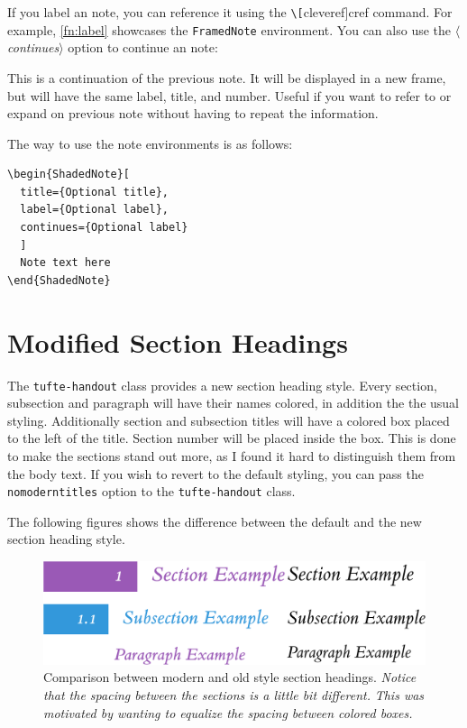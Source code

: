 \documentclass[a4paper]{tufte-handout}
\newcommand{\hlorange}[1]{\textcolor{tufte-orange}{#1}}
\newcommand{\doccmd}[1]{\hlorange{\texttt{\textbackslash#1}}}
\newcommand{\docopt}[1]{\( \langle \)\textrm{\textit{#1}}\( \rangle \)}
\newcommand{\docenv}[1]{\hlorange{\texttt{#1}}}
\newcommand{\doccls}[1]{\texttt{#1}}
\newcommand{\docclsopt}[1]{\hlorange{\texttt{#1}}}
\begin{document}
If you label an note, you can reference it using the \doccmd[cleveref]{cref} command.
For example, \cref{fn:label} showcases the \docenv{FramedNote} environment.
You can also use the \docopt{continues} option to continue an note:

\begin{FramedNote}[continues={fn:label}]
  This is a continuation of the previous note. 
  It will be displayed in a new frame, but will have the same label, title, and number.
  Useful if you want to refer to or expand on previous note without having to repeat the information.
\end{FramedNote}

\noindent The way to use the note environments is as follows:
\begin{Verbatim}
\begin{ShadedNote}[
  title={Optional title}, 
  label={Optional label},
  continues={Optional label}
  ]
  Note text here
\end{ShadedNote}  
\end{Verbatim}


\section{Modified Section Headings}\label{sec:changed-section-headings}
The \doccls{tufte-handout} class provides a new section heading style.
Every section, subsection and paragraph will have their names colored, in addition the the usual styling.
Additionally section and subsection titles will have a colored box placed to the left of the title.
Section number will be placed inside the box.
This is done to make the sections stand out more, as I found it hard to distinguish them from the body text.
If you wish to revert to the default styling, you can pass the \docclsopt{nomoderntitles} option to the \doccls{tufte-handout} class.

The following figures shows the difference between the default and the new section heading style.

\begin{figure}
  \includegraphics{section-comparison.png}
  \caption[Comparison between modern and old section styles]{%
    Comparison between modern and old style section headings.
    \emph{Notice that the spacing between the sections is a little bit different.}
    \emph{This was motivated by wanting to equalize the spacing between colored boxes.}
  }\label{fig:section-headings}
\end{figure}
\end{document}
